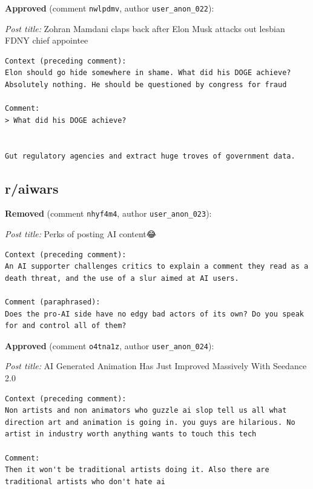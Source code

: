 \noindent\textbf{Approved} (comment \texttt{nwlpdmv}, author \texttt{user\_anon\_022}):

\noindent\emph{Post title:} Zohran Mamdani claps back after Elon Musk attacks out lesbian FDNY chief appointee

\begin{lstlisting}
Context (preceding comment):
Elon should go hide somewhere in shame. What did his DOGE achieve? Absolutely nothing. He should be questioned by congress for fraud

Comment:
> What did his DOGE achieve?


Gut regulatory agencies and extract huge troves of government data.
\end{lstlisting}


\subsection*{r/aiwars}

\noindent\textbf{Removed} (comment \texttt{nhyf4m4}, author \texttt{user\_anon\_023}):

\noindent\emph{Post title:} Perks of posting AI content😂

\begin{lstlisting}
Context (preceding comment):
An AI supporter challenges critics to explain a comment they read as a death threat, and the use of a slur aimed at AI users.

Comment (paraphrased):
Does the pro-AI side have no edgy bad actors of its own? Do you speak for and control all of them?
\end{lstlisting}

\noindent\textbf{Approved} (comment \texttt{o4tna1z}, author \texttt{user\_anon\_024}):

\noindent\emph{Post title:} AI Generated Animation Has Just Improved Massively With Seedance 2.0

\begin{lstlisting}
Context (preceding comment):
Non artists and non animators who guzzle ai slop tell us all what direction art and animation is going in. you guys are hilarious. No artist in industry worth anything wants to touch this tech

Comment:
Then it won't be traditional artists doing it. Also there are traditional artists who don't hate ai
\end{lstlisting}
